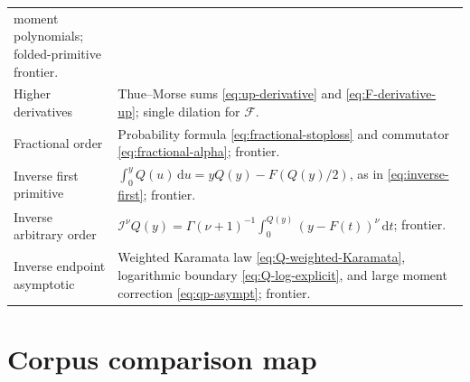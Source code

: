 \documentclass[11pt,oneside]{article}
\theoremstyle{definition}
\theoremstyle{remark}
\newcommand{\Fs}{\mathcal F}
\newcommand{\dd}{\,\mathrm d}
\newcommand{\RL}{\mathcal I}
\newcommand{\1}{\mathbf 1}
\begin{document}
\begin{longtable}{@{}p{}p{}@{}}
moment polynomials; folded-primitive frontier.\\[1mm]
Higher derivatives&
Thue--Morse sums \eqref{eq:up-derivative} and
\eqref{eq:F-derivative-up}; single dilation for \(\Fs\).\\[1mm]
Fractional order&
Probability formula \eqref{eq:fractional-stoploss} and commutator
\eqref{eq:fractional-alpha}; frontier.\\[1mm]
Inverse first primitive&
\(\int_0^yQ(u)\dd u=yQ(y)-F(Q(y)/2)\), as in
\eqref{eq:inverse-first}; frontier.\\[1mm]
Inverse arbitrary order&
\(\RL^\nu Q(y)=\Gamma(\nu+1)^{-1}\int_0^{Q(y)}(y-F(t))^\nu\dd t\);
frontier.\\[1mm]
Inverse endpoint asymptotic&
Weighted Karamata law \eqref{eq:Q-weighted-Karamata}, logarithmic boundary
\eqref{eq:Q-log-explicit}, and large moment correction \eqref{eq:qp-asympt};
frontier.\\
\bottomrule
\end{longtable}

\appendix

\section{Corpus comparison map}
\end{document}
